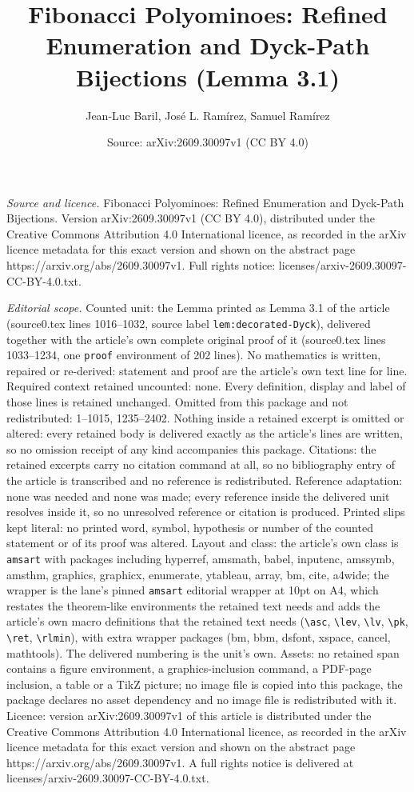 \documentclass[10pt,a4paper]{amsart}
\title[Fibonacci Polyominoes: Refined Enumeration and Dyck-Path Bij]{Fibonacci Polyominoes: Refined Enumeration and Dyck-Path Bijections (Lemma 3.1)}
\author{Jean-Luc Baril, Jos\'e L. Ram\'irez, Samuel Ram\'irez}
\date{Source: arXiv:2609.30097v1 (CC BY 4.0)}
\begin{document}
\maketitle

\noindent\emph{Source and licence.} Fibonacci Polyominoes: Refined Enumeration and Dyck-Path Bijections. Version arXiv:2609.30097v1 (CC BY 4.0), distributed under the Creative Commons Attribution 4.0 International licence, as recorded in the arXiv licence metadata for this exact version and shown on the abstract page https://arxiv.org/abs/2609.30097v1. Full rights notice: licenses/arxiv-2609.30097-CC-BY-4.0.txt.\par\smallskip

\noindent\textit{Editorial scope.} Counted unit: the Lemma printed as Lemma 3.1 of the article (source0.tex lines 1016--1032, source label \texttt{lem:decorated-Dyck}), delivered together with the article's own complete original proof of it (source0.tex lines 1033--1234, one \texttt{proof} environment of 202 lines). No mathematics is written, repaired or re-derived: statement and proof are the article's own text line for line. Required context retained uncounted: none. Every definition, display and label of those lines is retained unchanged. Omitted from this package and not redistributed: 1--1015, 1235--2402. Nothing inside a retained excerpt is omitted or altered: every retained body is delivered exactly as the article's lines are written, so no omission receipt of any kind accompanies this package. Citations: the retained excerpts carry no citation command at all, so no bibliography entry of the article is transcribed and no reference is redistributed. Reference adaptation: none was needed and none was made; every reference inside the delivered unit resolves inside it, so no unresolved reference or citation is produced. Printed slips kept literal: no printed word, symbol, hypothesis or number of the counted statement or of its proof was altered. Layout and class: the article's own class is \texttt{amsart} with packages including hyperref, amsmath, babel, inputenc, amssymb, amsthm, graphics, graphicx, enumerate, ytableau, array, bm, cite, a4wide; the wrapper is the lane's pinned \texttt{amsart} editorial wrapper at 10pt on A4, which restates the theorem-like environments the retained text needs and adds the article's own macro definitions that the retained text needs (\texttt{\textbackslash asc}, \texttt{\textbackslash lev}, \texttt{\textbackslash lv}, \texttt{\textbackslash pk}, \texttt{\textbackslash ret}, \texttt{\textbackslash rlmin}), with extra wrapper packages (bm, bbm, dsfont, xspace, cancel, mathtools). The delivered numbering is the unit's own. Assets: no retained span contains a figure environment, a graphics-inclusion command, a PDF-page inclusion, a table or a TikZ picture; no image file is copied into this package, the package declares no asset dependency and no image file is redistributed with it. Licence: version arXiv:2609.30097v1 of this article is distributed under the Creative Commons Attribution 4.0 International licence, as recorded in the arXiv licence metadata for this exact version and shown on the abstract page https://arxiv.org/abs/2609.30097v1. A full rights notice is delivered at licenses/arxiv-2609.30097-CC-BY-4.0.txt. 
\end{document}
